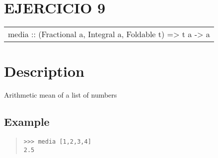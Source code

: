 \section{EJERCICIO 9}
\begin{haddockdesc}
\item[\begin{tabular}{@{}l}
media :: (Fractional a, Integral a, Foldable t) => t a -> a
\end{tabular}]
{\haddockbegindoc
\section*{Description}
Arithmetic mean of a list of numbers\par
\subsection*{Example}
\begin{quote}
{\haddockverb\begin{verbatim}
>>> media [1,2,3,4]
2.5

\end{verbatim}}
\end{quote}}
\end{haddockdesc}
